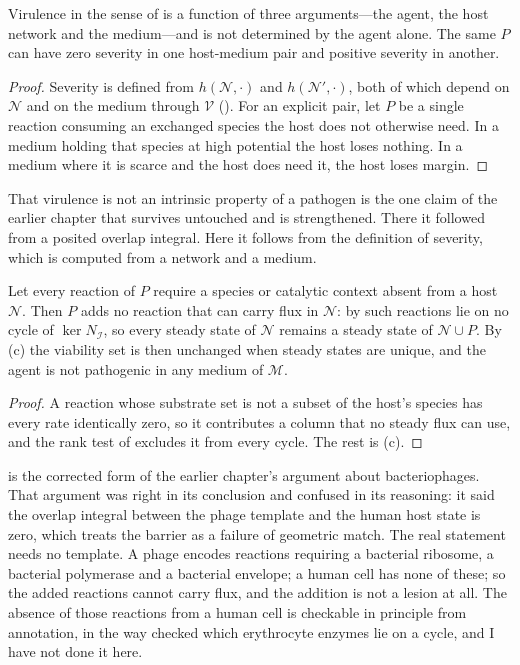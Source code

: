 \begin{proposition}
\label{sm:prop-virulence}
\lnkD{} Virulence in the sense of  is a function of
three arguments---the agent, the host network and the medium---and is not
determined by the agent alone. The same $P$ can have zero severity in one
host-medium pair and positive severity in another.
\end{proposition}

\begin{proof}
Severity is defined from $h(\mathcal N,\cdot)$ and $h(\mathcal N',\cdot)$,
both of which depend on $\mathcal N$ and on the medium through
$\mathcal V$ (). For an explicit pair, let $P$ be a
single reaction consuming an exchanged species the host does not otherwise
need. In a medium holding that species at high potential the host loses
nothing. In a medium where it is scarce and the host does need it, the host
loses margin.
\end{proof}

That virulence is not an intrinsic property of a pathogen is the one claim
of the earlier chapter that survives untouched and is strengthened. There it
followed from a posited overlap integral. Here it follows from the
definition of severity, which is computed from a network and a medium.

\begin{proposition}
\label{sm:prop-host-range}
\lnkD{} Let every reaction of $P$ require a species or catalytic context
absent from a host $\mathcal N$. Then $P$ adds no reaction that can carry
flux in $\mathcal N$: by  such reactions lie on no cycle
of $\ker N_{\mathcal I}$, so every steady state of $\mathcal N$ remains a
steady state of $\mathcal N\cup P$. By (c) the
viability set is then unchanged when steady states are unique, and the agent
is not pathogenic in any medium of $\mathcal M$.
\end{proposition}

\begin{proof}
A reaction whose substrate set is not a subset of the host's species has
every rate identically zero, so it contributes a column that no steady flux
can use, and the rank test of  excludes it from every
cycle. The rest is (c).
\end{proof}

 is the corrected form of the earlier chapter's
argument about bacteriophages. That argument was right in its conclusion and
confused in its reasoning: it said the overlap integral between the phage
template and the human host state is zero, which treats the barrier as a
failure of geometric match. The real statement needs no template. A phage
encodes reactions requiring a bacterial ribosome, a bacterial polymerase and
a bacterial envelope; a human cell has none of these; so the added
reactions cannot carry flux, and the addition is not a lesion at all. The
absence of those reactions from a human cell is checkable in principle from
annotation, in the way  checked which erythrocyte
enzymes lie on a cycle, and I have not done it here.


